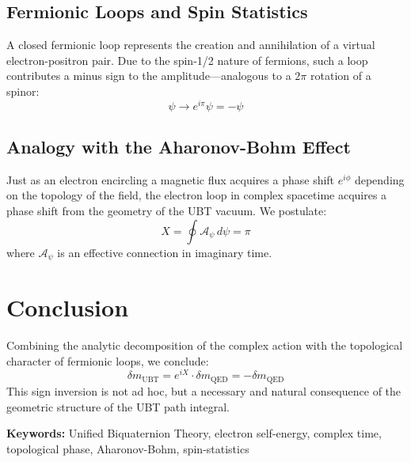 \documentclass[12pt, a4paper]{article}
\begin{document}
\subsection{Fermionic Loops and Spin Statistics}

A closed fermionic loop represents the creation and annihilation of a virtual electron-positron pair. Due to the spin-1/2 nature of fermions, such a loop contributes a minus sign to the amplitude—analogous to a \( 2\pi \) rotation of a spinor:
\[
\psi \rightarrow e^{i\pi} \psi = -\psi
\]

\subsection{Analogy with the Aharonov-Bohm Effect}

Just as an electron encircling a magnetic flux acquires a phase shift \( e^{i\phi} \) depending on the topology of the field, the electron loop in complex spacetime acquires a phase shift from the geometry of the UBT vacuum. We postulate:
\[
X = \oint \mathcal{A}_{\psi} \, d\psi = \pi
\]
where \( \mathcal{A}_{\psi} \) is an effective connection in imaginary time.

\section{Conclusion}

Combining the analytic decomposition of the complex action with the topological character of fermionic loops, we conclude:
\[
\delta m_{\text{UBT}} = e^{iX} \cdot \delta m_{\text{QED}} = -\delta m_{\text{QED}}
\]
This sign inversion is not ad hoc, but a necessary and natural consequence of the geometric structure of the UBT path integral.

\bigskip
\noindent\textbf{Keywords:} Unified Biquaternion Theory, electron self-energy, complex time, topological phase, Aharonov-Bohm, spin-statistics
\end{document}
